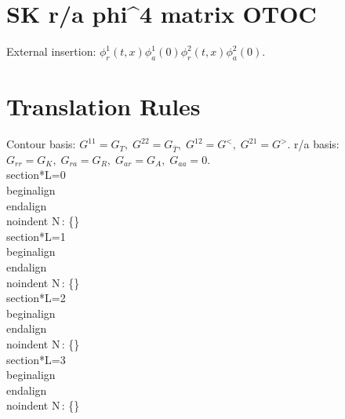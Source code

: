 \documentclass{article}
\begin{document}
\section*{SK r/a phi^4 matrix OTOC}
External insertion: $\phi^{1}_{r}(t,x)\phi^{1}_{a}(0)\phi^{2}_{r}(t,x)\phi^{2}_{a}(0)$.
\section*{Translation Rules}
Contour basis:
$G^{11}=G_T,\;G^{22}=G_{\bar T},\;G^{12}=G^<,\;G^{21}=G^>$.
r/a basis:
$G_{rr}=G_K,\;G_{ra}=G_R,\;G_{ar}=G_A,\;G_{aa}=0$.\n\\section*{L=0}\n\\begin{align}\n\\end{align}\n\\noindent N\,: \{\}\n\n\\section*{L=1}\n\\begin{align}\n\\end{align}\n\\noindent N\,: \{\}\n\n\\section*{L=2}\n\\begin{align}\n\\end{align}\n\\noindent N\,: \{\}\n\n\\section*{L=3}\n\\begin{align}\n\\end{align}\n\\noindent N\,: \{\}\n
\end{document}
